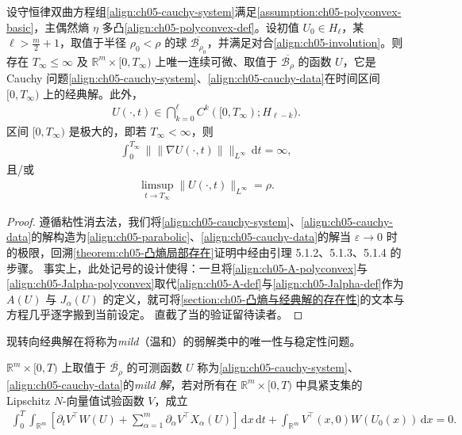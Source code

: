 \documentclass[../../main.tex]{subfiles}
\begin{document}
\begin{theorem}\label{theorem:ch05-polyconvex-existence}
设守恒律双曲方程组\eqref{align:ch05-cauchy-system}满足\cref{assumption:ch05-polyconvex-basic}，主偶然熵 $\eta$ 多凸\eqref{align:ch05-polyconvex-def}。设初值 $U_{0}\in H_{\ell}$，某 $\ell>\frac{m}{2}+1$，取值于半径 $\rho_{0}<\rho$ 的球 $\overline{\mathscr{B}_{\rho_{0}}}$，并满足对合\eqref{align:ch05-involution}。则存在 $T_{\infty}\leqslant\infty$ 及 $\mathbb{R}^{m}\times[0,T_{\infty})$ 上唯一连续可微、取值于 $\overline{\mathscr{B}_{\rho}}$ 的函数 $U$，它是 Cauchy 问题\eqref{align:ch05-cauchy-system}、\eqref{align:ch05-cauchy-data}在时间区间 $[0,T_{\infty})$ 上的经典解。此外，
\begin{align}
U(\cdot,t)\in\bigcap_{k=0}^{\ell}C^{k}([0,T_{\infty});H_{\ell-k}).\label{align:ch05-polyconvex-regularity}
\end{align}
区间 $[0,T_{\infty})$ 是极大的，即若 $T_{\infty}<\infty$，则
\begin{align}
\int_{0}^{T_{\infty}}\|\|\nabla U(\cdot,t)\|\|_{L^{\infty}}\,\mathrm{d}t=\infty,\label{align:ch05-polyconvex-blowup1}
\end{align}
且/或
\begin{align}
\limsup_{t\to T_{\infty}}\|U(\cdot,t)\|_{L^{\infty}}=\rho.\label{align:ch05-polyconvex-blowup2}
\end{align}
\end{theorem}

\begin{proof}
遵循粘性消去法，我们将\eqref{align:ch05-cauchy-system}、\eqref{align:ch05-cauchy-data}的解构造为\eqref{align:ch05-parabolic}、\eqref{align:ch05-cauchy-data}的解当 $\varepsilon\to0$ 时的极限，回溯\cref{theorem:ch05-凸熵局部存在}证明中经由引理 5.1.2、5.1.3、5.1.4 的步骤。
事实上，此处记号的设计使得：一旦将\eqref{align:ch05-A-polyconvex}与\eqref{align:ch05-Jalpha-polyconvex}取代\eqref{align:ch05-A-def}与\eqref{align:ch05-Jalpha-def}作为 $A(U)$ 与 $J_{\alpha}(U)$ 的定义，就可将\cref{section:ch05-凸熵与经典解的存在性}的文本与方程几乎逐字搬到当前设定。
直截了当的验证留待读者。
\end{proof}

现转向经典解在将称为\emph{mild}（温和）的弱解类中的唯一性与稳定性问题。

\begin{definition}[mild 解]\label{definition:ch05-mild}
$\mathbb{R}^{m}\times[0,T)$ 上取值于 $\overline{\mathscr{B}_{\rho}}$ 的可测函数 $U$ 称为\eqref{align:ch05-cauchy-system}、\eqref{align:ch05-cauchy-data}的\emph{mild 解}，若对所有在 $\mathbb{R}^{m}\times[0,T)$ 中具紧支集的 Lipschitz $N$-向量值试验函数 $V$，成立
\begin{align}
\int_{0}^{T}\int_{\mathbb{R}^{m}}[\partial_{t}V^{\top}W(U)+\sum_{\alpha=1}^{m}\partial_{\alpha}V^{\top}X_{\alpha}(U)]\,\mathrm{d}x\,\mathrm{d}t+\int_{\mathbb{R}^{m}}V^{\top}(x,0)W(U_{0}(x))\,\mathrm{d}x=0.\label{align:ch05-mild-def}
\end{align}
\end{definition}
\end{document}
